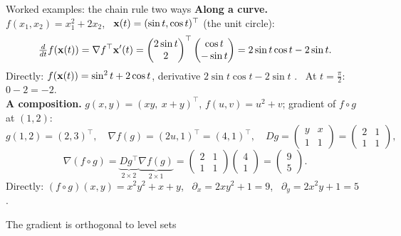 \documentclass[aspectratio=1610,11pt]{beamer}
\begin{document}
\begin{frame}{Worked examples: the chain rule two ways}
    \small
    \textbf{Along a curve.} $f(x_1, x_2) = x_1^2 + 2x_2$, \ $\mathbf{x}(t) = (\sin t, \cos t)^\top$ (the unit circle):
    \[\tfrac{d}{dt}f(\mathbf{x}(t)) = \nabla f^\top\mathbf{x}'(t) = \begin{pmatrix} 2\sin t \\ 2 \end{pmatrix}^\top\begin{pmatrix} \cos t \\ -\sin t \end{pmatrix} = 2\sin t\cos t - 2\sin t.\]
    Directly: $f(\mathbf{x}(t)) = \sin^2t + 2\cos t$, derivative $2\sin t\cos t - 2\sin t$ \checkmark. \ At $t = \frac{\pi}{2}$: $0 - 2 = -2$.
    \\[0.5em]
    \textbf{A composition.} $g(x, y) = (xy, \ x + y)^\top$, $f(u, v) = u^2 + v$; gradient of $f \circ g$ at $(1, 2)$:
    \[g(1, 2) = (2, 3)^\top, \quad \nabla f(g) = (2u, 1)^\top = (4, 1)^\top, \quad Dg = \begin{pmatrix} y & x \\ 1 & 1 \end{pmatrix} = \begin{pmatrix} 2 & 1 \\ 1 & 1 \end{pmatrix},\]
    \[\nabla(f \circ g) = \underbrace{Dg^\top}_{2 \times 2}\underbrace{\nabla f(g)}_{2 \times 1} = \begin{pmatrix} 2 & 1 \\ 1 & 1 \end{pmatrix}\begin{pmatrix} 4 \\ 1 \end{pmatrix} = \begin{pmatrix} 9 \\ 5 \end{pmatrix}.\]
    Directly: $(f \circ g)(x, y) = x^2y^2 + x + y$, \ $\partial_x = 2xy^2 + 1 = 9$, \ $\partial_y = 2x^2y + 1 = 5$ \checkmark.
\end{frame}

\begin{frame}{The gradient is orthogonal to level sets}
\end{frame}
\end{document}
